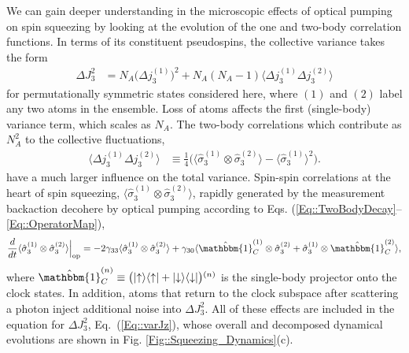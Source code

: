 \documentclass[preprint, aps,pra,onecolumn]{revtex4-1} %
\def\bra#1{\langle{#1}\rvert}%
\def\ket#1{\lvert{#1}\rangle}%
\newcommand{\erf}[1]{Eq.~(\ref{#1})}
\newcommand{\op}[2]{\ket{#1}\bra{#2}}
\newcommand{\expt}[1]{\langle{#1}\rangle}
\newcommand{\smallfrac}[2]{\mbox{$\frac{#1}{#2}$}}
\newcommand{\varz}{\Delta J_3^2}
\begin{document}
We can gain deeper understanding in the microscopic effects of optical pumping on spin squeezing by looking at the evolution of the one and two-body correlation functions.  In terms of its constituent pseudospins, the collective variance takes the form
	\begin{align} \label{Eq::VarianceDecomposition}
	\varz & = N_A \big( \Delta j_3^{(1)} \big)^2 + N_A(N_A-1) \expt{ \Delta j_3^{(1)} \Delta j_3^{(2)} }
	\end{align}
for permutationally symmetric states considered here, where $(1)$ and $(2)$ label any two atoms in the ensemble. Loss of atoms affects the first (single-body) variance term, which scales as $N_A$.
The two-body correlations which contribute as $N_A^2$ to the collective fluctuations, 
	\begin{align}
		\expt{ \Delta j_3^{(1)} \Delta j_3^{(2)} } &\equiv \smallfrac{1}{4} \big( \expt{ \hat{\sigma}_3^{(1)} \otimes \hat{\sigma}_3^{(2)}  } - \expt{\hat{\sigma}_3^{(1)} }^2  \big).
\end{align}
have a much larger influence on the total variance. Spin-spin correlations at the heart of spin squeezing, $\expt{ \hat{\sigma}_3^{(1)} \otimes \hat{\sigma}_3^{(2)} }$, rapidly generated by the measurement backaction decohere by optical pumping according to Eqs. (\ref{Eq::TwoBodyDecay}--\ref{Eq::OperatorMap}),
	\begin{align} \label{Eq::TwoBodySpinDecay}
		\frac{d}{dt} \expt{\hat{\sigma}_3^{(1)} \otimes \hat{\sigma}_3^{(2)} }  \Big|_{\rm op} = - 2 \gamma_{33}  \expt{\hat{\sigma}_3^{(1)} \otimes \hat{\sigma}_3^{(2)}} + \gamma_{30} \expt{ \hat{\mathbbm{1}}^{(1)}_C \otimes \hat{\sigma}_3^{(2)} + \hat{\sigma}_3^{(1)} \otimes \hat{\mathbbm{1}}^{(2)}_C },
	\end{align}
where $\hat{\mathbbm{1}}^{(n)}_C \equiv \big( \op{\uparrow}{\uparrow} + \op{\downarrow}{\downarrow} \big){}^{(n)}$ is the single-body projector onto the clock states.   
In addition, atoms that return to the clock subspace after scattering a photon inject additional noise into $\varz$.  
All of these effects are included in the equation for $\varz$, \erf{Eq::varJz}, whose overall and decomposed dynamical evolutions are shown in Fig. \ref{Fig::Squeezing_Dynamics}(c). 
\end{document}

